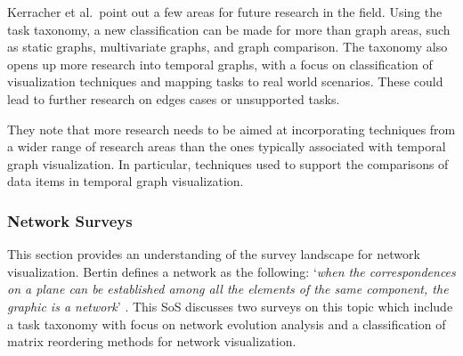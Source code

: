 
Kerracher et al.\ point out a few areas for future research in the field. Using the task taxonomy, a new classification can be made for more than graph areas, such as static graphs, multivariate graphs, and graph comparison. The taxonomy also opens up more research into temporal graphs, with a focus on classification of visualization techniques and mapping tasks to real world scenarios.  These could lead to further research on edges cases or unsupported tasks.

They note that more research needs to be aimed at incorporating techniques from a wider range of research areas than the ones typically associated with temporal graph visualization. In particular, techniques used to support the comparisons of data items in temporal graph visualization. 

\subsubsection{Network Surveys}
This section provides an understanding of the survey landscape for network visualization. Bertin defines a network as the following: `\textit{when the correspondences on a plane can be established among all the elements of the same component, the graphic is a network}' \cite{bertin1983semiology}. This SoS discusses two surveys on this topic which include a task taxonomy with focus on network evolution analysis and a classification of matrix reordering methods for network visualization.

